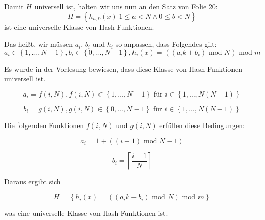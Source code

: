\documentclass{article}
\begin{document}
Damit $H$ universell ist, halten wir uns nun an den Satz von Folie 20:
\begin{equation}
  H = \left\{ h_{a, b} \left( x \right) | 1 \leq a < N \land 0 \leq b < N \right\}
\end{equation}
ist eine universelle Klasse von Hash-Funktionen.

Das hei{\ss}t, wir m{\"u}ssen $a_i$, $b_i$ und $h_i$ so anpassen, dass Folgendes
gilt:
\begin{equation}
  a_i \in \left\{ 1, \ldots, N - 1 \right\},
  b_i \in \left\{ 0, \ldots, N - 1 \right\},
  h_i \left( x \right) = \left( \left( a_ik + b_i \right)\text{ mod } N \right)\text{ mod } m
\end{equation}

Es wurde in der Vorlesung bewiesen, dass diese Klasse von Hash-Funktionen
universell ist.

\clearpage

\begin{equation}
  a_i = f \left( i, N \right),
  f \left( i, N \right) \in \left\{ 1, \ldots, N - 1 \right\}\text{ f{\"u}r }
  i \in \left\{ 1, \ldots, N \left( N - 1 \right) \right\}
\end{equation}

\begin{equation}
  b_i = g \left( i, N \right),
  g \left( i, N \right) \in \left\{ 0, \ldots, N - 1 \right\}\text{ f{\"u}r }
  i \in \left\{ 1, \ldots, N \left( N - 1 \right) \right\}
\end{equation}

Die folgenden Funktionen $f \left( i, N \right)$ und $g \left( i, N \right)$
erf{\"u}llen diese Bedingungen:

\begin{equation}
  a_i = 1 + \left( \left( i - 1 \right)\text{ mod } N - 1 \right)
\end{equation}

\begin{equation}
  b_i = \left\lceil \frac{i - 1}{N} \right\rceil
\end{equation}

Daraus ergibt sich

\begin{equation}
  H = \left\{ h_i \left( x \right) = \left( \left( a_ik + b_i \right)\text{ mod } N \right)\text{ mod } m \right\}
\end{equation}

was eine universelle Klasse von Hash-Funktionen ist.
\end{document}
